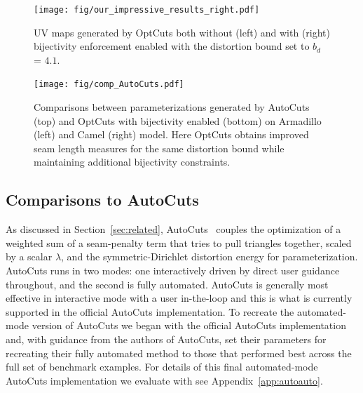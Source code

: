 


%
\begin{figure}[t]
\centering
\texttt{[image: fig/our\_impressive\_results\_right.pdf]}
\vspace{-0.3cm}
\caption{UV maps generated by OptCuts both without (left) and with (right) bijectivity enforcement enabled with the distortion bound set to $b_d$ = $4.1$.}
\vspace{-0.3cm}
\label{fig:our_impressive_results}
\end{figure}


\begin{figure}[tb]
\centering
\texttt{[image: fig/comp\_AutoCuts.pdf]}
\vspace{-0.3cm}
\caption{Comparisons between parameterizations generated by AutoCuts (top) and OptCuts with bijectivity enabled (bottom) on Armadillo (left) and Camel (right) model. Here OptCuts obtains improved  seam length measures for the same distortion bound while maintaining additional bijectivity constraints.}
\vspace{-0.3cm}
\label{fig:comp_AutoCuts}
\end{figure}



\subsection{Comparisons to AutoCuts}
\label{sec:autocmpr}
As discussed in Section~\ref{sec:related}, AutoCuts~\cite{Poranne2017Autocuts} couples the optimization of a weighted sum of a seam-penalty term that tries to pull triangles together, scaled by a scalar $\lambda$, and the symmetric-Dirichlet distortion energy for parameterization. AutoCuts runs in two modes: one interactively driven by direct user guidance throughout, and the second is fully automated. AutoCuts is generally most effective in interactive mode with a user in-the-loop and this is what is currently supported in the official AutoCuts implementation. To recreate the automated-mode version of AutoCuts we began with the official AutoCuts implementation and, with guidance from the authors of AutoCuts, set their parameters for recreating their fully automated method to those that performed best across the full set of benchmark examples. For details of this final automated-mode AutoCuts implementation we evaluate with see Appendix\ \ref{app:autoauto}.


